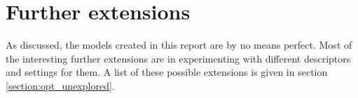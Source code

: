 
\section{Further extensions}
\label{section:con_extensions}

As discussed, the models created in this report are by no means perfect.
Most of the interesting further extensions are in experimenting with different descriptors and settings for them.
A list of these possible extensions is given in section \ref{section:opt_unexplored}.